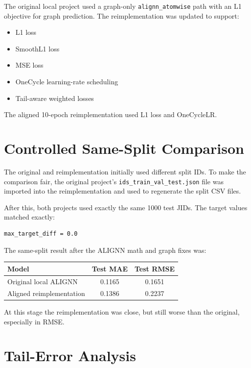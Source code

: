\documentclass[11pt,a4paper]{article}
\begin{document}
The original local project used a graph-only \texttt{alignn\_atomwise} path with an L1 objective for graph prediction. The reimplementation was updated to support:

\begin{itemize}
  \item L1 loss
  \item SmoothL1 loss
  \item MSE loss
  \item OneCycle learning-rate scheduling
  \item Tail-aware weighted losses
\end{itemize}

The aligned 10-epoch reimplementation used L1 loss and OneCycleLR.

\section{Controlled Same-Split Comparison}

The original and reimplementation initially used different split IDs. To make the comparison fair, the original project's \texttt{ids\_train\_val\_test.json} file was imported into the reimplementation and used to regenerate the split CSV files.

After this, both projects used exactly the same 1000 test JIDs. The target values matched exactly:

\begin{verbatim}
max_target_diff = 0.0
\end{verbatim}

The same-split result after the ALIGNN math and graph fixes was:

\begin{center}
\begin{tabular}{lcc}
\toprule
Model & Test MAE & Test RMSE \\
\midrule
Original local ALIGNN & 0.1165 & 0.1651 \\
Aligned reimplementation & 0.1386 & 0.2237 \\
\bottomrule
\end{tabular}
\end{center}

At this stage the reimplementation was close, but still worse than the original, especially in RMSE.

\section{Tail-Error Analysis}
\end{document}
